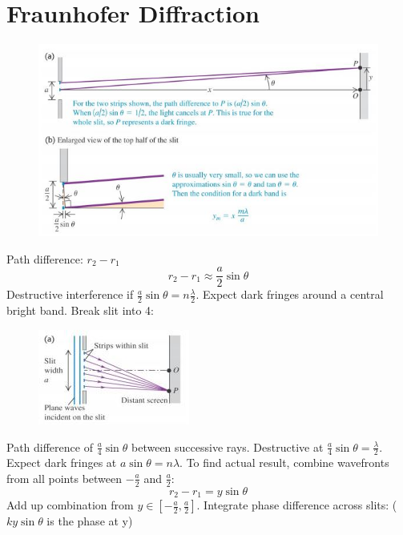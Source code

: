 \documentclass[a4paper, 11pt, normalem]{report}
\begin{document}
\section{Fraunhofer Diffraction}
\begin{figure}[H]
    \centering
    \includegraphics{Fraunhofer.jpg} 
\end{figure}
Path difference: $r_{2} - r_{1}$
\begin{equation}
    r_{2} - r_{1} \approx \frac{a}{2}\sin{\theta}
\end{equation}
Destructive interference if $\frac{a}{2}\sin{\theta} = n\frac{\lambda}{2}$.
Expect dark fringes around a central bright band.
Break slit into 4: 
\begin{figure}[H]
    \centering
    \includegraphics[scale=1.6]{Diffrac1.jpg} 
\end{figure}
Path difference of $\frac{a}{4}\sin{\theta}$ between successive rays.
Destructive at $\frac{a}{4}\sin{\theta} = \frac{\lambda}{2}$.
Expect dark fringes at $a\sin{\theta} = n\lambda$.
To find actual result, combine wavefronts from all points between $-\frac{a}{2}$ and $\frac{a}{2}$:
\begin{equation}
    r_{2} - r_{1} = y\sin{\theta}
\end{equation}
Add up combination from $y \in {[{-\frac{a}{2}},\frac{a}{2}]}$.
Integrate phase difference across slits:
($ky\sin{\theta}$ is the phase at y)
\end{document}
